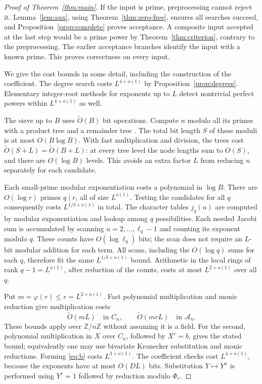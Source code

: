 \documentclass[11pt]{article}
\theoremstyle{definition}
\theoremstyle{remark}
\newcommand{\Z}{\mathbb Z}
\newcommand{\softO}{\widetilde O}
\newcommand{\A}{\mathcal A}
\begin{document}
\begin{proof}[Proof of Theorem~\ref{thm:main}]
If the input is prime, preprocessing cannot reject it.
Lemma~\ref{lem:aux}, using Theorem~\ref{thm:zero-free}, ensures
all searches succeed, and Proposition~\ref{prop:complete} proves
acceptance. A composite input accepted at the last step would be
a prime power by Theorem~\ref{thm:criterion}, contrary to the
preprocessing. The earlier acceptance branches identify the input
with a known prime. This proves correctness on every input.

We give the cost bounds in some detail, including the construction
of the coefficient. The degree search costs $L^{4+o(1)}$ by
Proposition~\ref{prop:degrees}. Elementary integer-root methods
for exponents up to $L$ detect nontrivial perfect powers within
$L^{4+o(1)}$ as well.

The sieve up to $B$ uses $\softO(B)$ bit operations. Compute $n$
modulo all its primes with a product tree and a remainder tree
\cite{remainder}. The total bit length $S$ of these moduli is at
most $O(B\log B)$. With fast multiplication and division, the
trees cost $\softO(S+L)=\softO(B+L)$: at every tree level the
node lengths sum to $O(S)$, and there are $O(\log B)$ levels.
This avoids an extra factor $L$ from reducing $n$ separately for
each candidate.

Each small-prime modular exponentiation costs a polynomial in
$\log B$. There are $O(\log r)$ primes $q\mid r$, all of size
$L^{o(1)}$. Testing the candidates for all $q$ consequently costs
$L^{1/\delta+o(1)}$ in total. The character tables $j_q(u)$
are computed by modular exponentiation and lookup among $q$
possibilities. Each needed Jacobi sum is accumulated by scanning
$u=2,\ldots,\ell_q-1$ and counting its exponent modulo $q$.
These counts have $O(\log\ell_q)$ bits; the scan does not require
an $L$-bit modular addition for each term. All scans, including
the $O(\log q)$ sums for each $q$, therefore fit the same
$L^{1/\delta+o(1)}$ bound. Arithmetic in the local rings of rank
$q-1=L^{o(1)}$, after reduction of the counts, costs at most
$L^{2+o(1)}$ over all $q$.

Put $m=\varphi(r)\le r=L^{2+o(1)}$. Fast polynomial
multiplication and monic reduction give multiplication costs
\[
 \softO(mL)\quad\text{in }C_n,\qquad
 \softO(mrL)\quad\text{in }\A_n.
\]
These bounds apply over $\Z/n\Z$ without assuming it is a field.
For the second, polynomial multiplication in $X$ over $C_n$,
followed by $X^r=b$, gives the stated bound; equivalently one
may use bivariate Kronecker substitution and monic reductions.
Forming \eqref{eq:b} costs $L^{3+o(1)}$. The coefficient
checks cost $L^{4+o(1)}$, because the exponents have at most
$O(DL)$ bits. Substitution $Y\mapsto Y^n$ is performed using
$Y^r=1$ followed by reduction modulo $\Phi_r$.


\end{proof}
\end{document}
